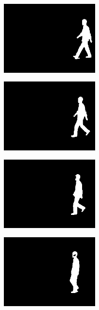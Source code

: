 \documentclass[12pt]{article}
\theoremstyle{definition}
\begin{document}
	\begin{figure}[h]
		\centering

		\begin{subfigure}{6cm}
			\centering\includegraphics[width=5cm]{silhouettes/walk/001-nm-01-090-050.png}
			\caption{}
		\end{subfigure}
		\hspace{0.5cm}
		\begin{subfigure}{6cm}
			\centering\includegraphics[width=5cm]{silhouettes/walk/001-nm-01-090-053.png}
			\caption{}
		\end{subfigure}

		\vspace{0.5cm}
		\begin{subfigure}{6cm}
			\centering\includegraphics[width=5cm]{silhouettes/walk/001-nm-01-090-055.png}
			\caption{}
		\end{subfigure}
		\hspace{0.5cm}
		\begin{subfigure}{6cm}
			\centering\includegraphics[width=5cm]{silhouettes/walk/001-nm-01-090-057.png}
			\caption{}
		\end{subfigure}


\end{figure}
\end{document}
